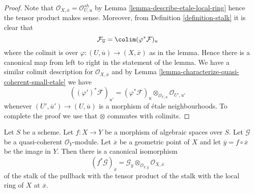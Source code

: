 \begin{proof}
Note that $\mathcal{O}_{X, \overline{x}} = \mathcal{O}_{U, u}^{sh}$ by
Lemma \ref{lemma-describe-etale-local-ring}
hence the tensor product makes sense. Moreover, from
Definition \ref{definition-stalk}
it is clear that
$$
\mathcal{F}_{\overline{u}} = \colim (\varphi^*\mathcal{F})_u
$$
where the colimit is over $\varphi : (U, \overline{u}) \to (X, \overline{x})$
as in the lemma. Hence there is a canonical map from left to right in
the statement of the lemma. We have a similar colimit description for
$\mathcal{O}_{X, \overline{x}}$
and by
Lemma \ref{lemma-characterize-quasi-coherent-small-etale}
we have
$$
((\varphi')^*\mathcal{F})_{u'} =
(\varphi^*\mathcal{F})_u \otimes_{\mathcal{O}_{U, u}} \mathcal{O}_{U', u'}
$$
whenever $(U', \overline{u}') \to (U, \overline{u})$ is a morphism of
\'etale neighbourhoods. To complete the proof we use that
$\otimes$ commutes with colimits.
\end{proof}

\begin{lemma}
\label{lemma-stalk-pullback-quasi-coherent}
Let $S$ be a scheme. Let $f : X \to Y$ be a morphism of algebraic spaces
over $S$. Let $\mathcal{G}$ be a quasi-coherent $\mathcal{O}_Y$-module.
Let $\overline{x}$ be a geometric point of $X$ and let
$\overline{y} = f \circ \overline{x}$ be the image in $Y$.
Then there is a canonical isomorphism
$$
(f^*\mathcal{G})_{\overline{x}} =
\mathcal{G}_{\overline{y}} \otimes_{\mathcal{O}_{Y, \overline{y}}}
\mathcal{O}_{X, \overline{x}}
$$
of the stalk of the pullback with the tensor product of the stalk
with the local ring of $X$ at $\overline{x}$.
\end{lemma}

